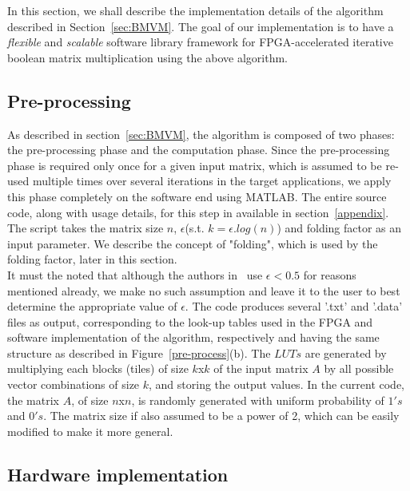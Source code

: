 \documentclass[conference, 9pt]{IEEEtran}
\begin{document}

In this section, we shall describe the implementation details of the algorithm described in Section~\ref{sec:BMVM}. The goal of our implementation is to have a \emph{flexible} and \emph{scalable} software library framework for FPGA-accelerated iterative boolean matrix multiplication using the above algorithm.\\

\subsection{Pre-processing}

As described in section~\ref{sec:BMVM}, the algorithm is composed of two phases: the pre-processing phase and the computation phase. Since the pre-processing phase is required only once for a given input matrix, which is assumed to be re-used multiple times over several iterations in the target applications, we apply this phase completely on the software end using MATLAB. The entire source code, along with usage details, for this step in available in section~\ref{appendix}. The script takes the matrix size $n$, $\epsilon$(s.t. $k = \epsilon .log(n)$) and folding factor as an input parameter. We describe the concept of "folding", which is used by the folding factor, later in this section.\\

It must the noted that although the authors in~\cite{williams2007matrix} use $\epsilon < 0.5$ for reasons mentioned already, we make no such assumption and leave it to the user to best determine the appropriate value of $\epsilon$. The code produces several '.txt' and '.data' files as output, corresponding to the look-up tables used in the FPGA and software implementation of the algorithm, respectively and having the same structure as described in Figure~\ref{pre-process}(b). The $LUTs$ are generated by multiplying each blocks (tiles) of size $k$x$k$ of the input matrix $A$ by all possible vector combinations of size $k$, and storing the output values. In the current code, the matrix $A$, of size $n$x$n$, is randomly generated with uniform probability of $1's$ and $0's$. The matrix size if also assumed to be a power of 2, which can be easily modified to make it more general.\\

\subsection{Hardware implementation}
\end{document}
